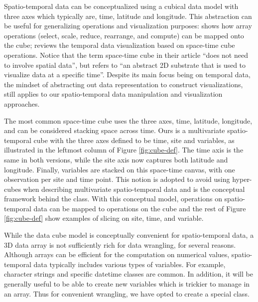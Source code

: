 \documentclass[
  shortnames]{jss}
\begin{document}
Spatio-temporal data can be conceptualized using a cubical data model with three axes which typically are, time, latitude and longitude. This abstraction can be useful for generalizing operations and visualization purposes: \citet{lu_multidimensional_2018} shows how array operations (select, scale, reduce, rearrange, and compute) can be mapped onto the cube; \citet{bach_review_2014} reviews the temporal data visualization based on space-time cube operations. Notice that the term space-time cube in their article ``does not need to involve spatial data'', but refers to ``an abstract 2D substrate that is used to visualize data at a specific time''. Despite its main focus being on temporal data, the mindset of abstracting out data representation to construct visualizations, still applies to our spatio-temporal data manipulation and visualization approaches.

The most common space-time cube uses the three axes, time, latitude, longitude, and can be considered stacking space across time. Ours is a multivariate spatio-temporal cube with the three axes defined to be time, site and variables, as illustrated in the leftmost column of Figure \ref{fig:cube-def}. The time axis is the same in both versions, while the site axis now captures both latitude and longitude. Finally, variables are stacked on this space-time canvas, with one observation per site and time point. This notion is adopted to avoid using hyper-cubes when describing multivariate spatio-temporal data and is the conceptual framework behind the  class. With this conceptual model, operations on spatio-temporal data can be mapped to operations on the cube and the rest of Figure \ref{fig:cube-def} show examples of slicing on site, time, and variable.

While the data cube model is conceptually convenient for spatio-temporal data, a 3D data array is not sufficiently rich for data wrangling, for several reasons. Although arrays can be efficient for the computation on numerical values, spatio-temporal data typically includes various types of variables. For example, character strings and specific datetime classes are common. In addition, it will be generally useful to be able to create new variables which is trickier to manage in an array. Thus for convenient wrangling, we have opted to create a special  class.
\end{document}
